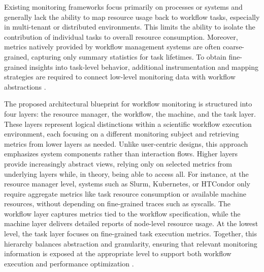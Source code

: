 Existing monitoring frameworks focus primarily on processes or systems and generally lack the ability to map resource usage back to workflow tasks, especially in multi-tenant or distributed environments. This limits the ability to isolate the contribution of individual tasks to overall resource consumption. Moreover, metrics natively provided by workflow management systems are often coarse-grained, capturing only summary statistics for task lifetimes. To obtain fine-grained insights into task-level behavior, additional instrumentation and mapping strategies are required to connect low-level monitoring data with workflow abstractions \cite{Witzke2024}.

The proposed architectural blueprint for workflow monitoring is structured into four layers: the resource manager, the workflow, the machine, and the task layer. These layers represent logical distinctions within a scientific workflow execution environment, each focusing on a different monitoring subject and retrieving metrics from lower layers as needed. Unlike user-centric designs, this approach emphasizes system components rather than interaction flows. Higher layers provide increasingly abstract views, relying only on selected metrics from underlying layers while, in theory, being able to access all. For instance, at the resource manager level, systems such as Slurm, Kubernetes, or HTCondor only require aggregate metrics like task resource consumption or available machine resources, without depending on fine-grained traces such as syscalls. The workflow layer captures metrics tied to the workflow specification, while the machine layer delivers detailed reports of node-level resource usage. At the lowest level, the task layer focuses on fine-grained task execution metrics. Together, this hierarchy balances abstraction and granularity, ensuring that relevant monitoring information is exposed at the appropriate level to support both workflow execution and performance optimization \cite{Bader_2022}.

